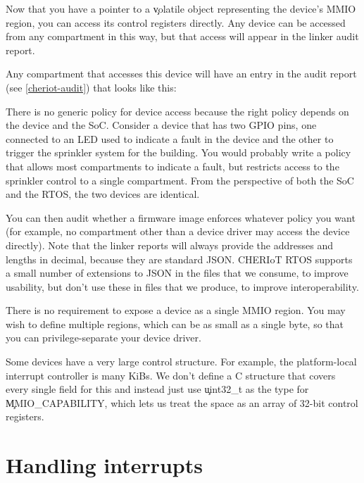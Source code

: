 Now that you have a pointer to a \c{volatile} object representing the device's MMIO region, you can access its control registers directly.
Any device can be accessed from any compartment in this way, but that access will appear in the linker audit report.


Any compartment that accesses this device will have an entry in the audit report (see \ref{cheriot-audit}) that looks like this:

\begin{jsonsnippet}
        {
          "kind": "MMIO",
          "length": 516,
          "start": 2550136832
        \},
\end{jsonsnippet}

\begin{note}
There is no generic policy for device access because the right policy depends on the device and the SoC.
Consider a device that has two GPIO pins, one connected to an LED used to indicate a fault in the device and the other to trigger the sprinkler system for the building.
You would probably write a policy that allows most compartments to indicate a fault, but restricts access to the sprinkler control to a single compartment.
From the perspective of both the SoC and the RTOS, the two devices are identical.
\end{note}

You can then audit whether a firmware image enforces whatever policy you want (for example, no compartment other than a device driver may access the device directly).
Note that the linker reports will always provide the addresses and lengths in decimal, because they are standard JSON.
CHERIoT RTOS supports a small number of extensions to JSON in the files that we consume, to improve usability, but don't use these in files that we produce, to improve interoperability.

There is no requirement to expose a device as a single MMIO region.
You may wish to define multiple regions, which can be as small as a single byte, so that you can privilege-separate your device driver.

Some devices have a very large control structure.
For example, the platform-local interrupt controller is many KiBs.
We don't define a C structure that covers every single field for this and instead just use \c{uint32_t} as the type for \c{MMIO_CAPABILITY}, which lets us treat the space as an array of 32-bit control registers.

\section{Handling interrupts}

